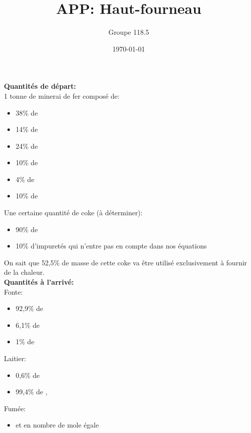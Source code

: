 \documentclass[11pt,a4paper]{report}
\author{Groupe 118.5}
\title{APP: Haut-fourneau}
\date{\today}
\begin{document}
\maketitle

\textbf{Quantités de départ:}\\

1 tonne de minerai de fer composé de:
\begin{itemize}
\item{38\% de }
\item{14\% de }
\item{24\% de }
\item{10\% de }
\item{4\% de }
\item{10\% de }\\
\end{itemize}


Une certaine quantité de coke (à déterminer):
\begin{itemize}
\item{90\% de }
\item{10\% d'impuretés qui n'entre pas en compte dans nos équations}
\end{itemize}
On sait que 52,5\% de masse de cette coke va être utilisé exclusivement à fournir de la chaleur.\\

\textbf{Quantités à l'arrivé:}\\

Fonte:
\begin{itemize}
\item{92,9\% de }
\item{6,1\% de }
\item{1\% de }\\
\end{itemize}

Laitier:
\begin{itemize}
\item{0,6\% de }
\item{99,4\% de , }\\
\end{itemize}

Fumée:
\begin{itemize}
\item{ et  en nombre de mole égale}
\end{itemize}
\end{document}
